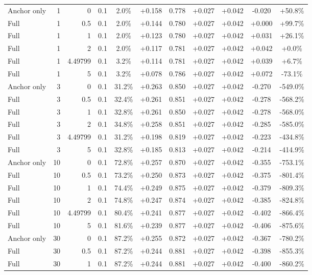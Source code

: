 \begin{table}[htbp]
\begin{tabular}{lrrrccccccc}
Anchor only & 1 & 0 & 0.1 & 2.0\% & +0.158 & 0.778 & +0.027 & +0.042 & -0.020 & +50.8\% \\
Full & 1 & 0.5 & 0.1 & 2.0\% & +0.144 & 0.780 & +0.027 & +0.042 & +0.000 & +99.7\% \\
Full & 1 & 1 & 0.1 & 2.0\% & +0.123 & 0.780 & +0.027 & +0.042 & +0.031 & +26.1\% \\
Full & 1 & 2 & 0.1 & 2.0\% & +0.117 & 0.781 & +0.027 & +0.042 & +0.042 & +0.0\% \\
Full & 1 & 4.49799 & 0.1 & 3.2\% & +0.114 & 0.781 & +0.027 & +0.042 & +0.039 & +6.7\% \\
Full & 1 & 5 & 0.1 & 3.2\% & +0.078 & 0.786 & +0.027 & +0.042 & +0.072 & -73.1\% \\
Anchor only & 3 & 0 & 0.1 & 31.2\% & +0.263 & 0.850 & +0.027 & +0.042 & -0.270 & -549.0\% \\
Full & 3 & 0.5 & 0.1 & 32.4\% & +0.261 & 0.851 & +0.027 & +0.042 & -0.278 & -568.2\% \\
Full & 3 & 1 & 0.1 & 32.8\% & +0.261 & 0.850 & +0.027 & +0.042 & -0.278 & -568.0\% \\
Full & 3 & 2 & 0.1 & 34.8\% & +0.258 & 0.851 & +0.027 & +0.042 & -0.285 & -585.0\% \\
Full & 3 & 4.49799 & 0.1 & 31.2\% & +0.198 & 0.819 & +0.027 & +0.042 & -0.223 & -434.8\% \\
Full & 3 & 5 & 0.1 & 32.8\% & +0.185 & 0.813 & +0.027 & +0.042 & -0.214 & -414.9\% \\
Anchor only & 10 & 0 & 0.1 & 72.8\% & +0.257 & 0.870 & +0.027 & +0.042 & -0.355 & -753.1\% \\
Full & 10 & 0.5 & 0.1 & 73.2\% & +0.250 & 0.873 & +0.027 & +0.042 & -0.375 & -801.4\% \\
Full & 10 & 1 & 0.1 & 74.4\% & +0.249 & 0.875 & +0.027 & +0.042 & -0.379 & -809.3\% \\
Full & 10 & 2 & 0.1 & 74.8\% & +0.247 & 0.874 & +0.027 & +0.042 & -0.385 & -824.8\% \\
Full & 10 & 4.49799 & 0.1 & 80.4\% & +0.241 & 0.877 & +0.027 & +0.042 & -0.402 & -866.4\% \\
Full & 10 & 5 & 0.1 & 81.6\% & +0.239 & 0.877 & +0.027 & +0.042 & -0.406 & -875.6\% \\
Anchor only & 30 & 0 & 0.1 & 87.2\% & +0.255 & 0.872 & +0.027 & +0.042 & -0.367 & -780.2\% \\
Full & 30 & 0.5 & 0.1 & 87.2\% & +0.244 & 0.881 & +0.027 & +0.042 & -0.398 & -855.3\% \\
Full & 30 & 1 & 0.1 & 87.2\% & +0.244 & 0.881 & +0.027 & +0.042 & -0.400 & -860.2\% \\

\end{tabular}
\end{table}
